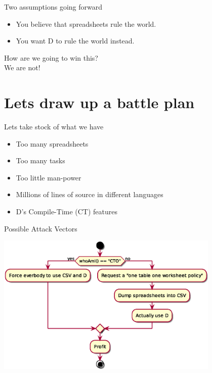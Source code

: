\documentclass[aspectratio=169,notes]{beamer}
\begin{document}
	\begin{frame}{Two assumptions going forward}
		\huge
		\begin{itemize}
			\item You believe that spreadsheets rule the world.
			\item You want D to rule the world instead.
		\end{itemize}
	\end{frame}

	\begin{frame}{\mbox{}}
		\begin{center}
			\huge
			How are we going to win this?\\[2cm]
			\pause
			We are not!
		\end{center}
	\end{frame}

	\section{Lets draw up a battle plan}

	\begin{frame}{Lets take stock of what we have}
		\large
		\begin{itemize}
			\item Too many spreadsheets
			\item Too many tasks
			\item Too little man-power\\[1cm] \pause
			\item Millions of lines of source in different languages
			\item D's Compile-Time (CT) features
		\end{itemize}
	\end{frame}

	\begin{frame}{Possible Attack Vectors}
		\begin{center}
		\includegraphics[width=0.8\textwidth]{attackvectors.eps}
		\end{center}
	\end{frame}
\end{document}
